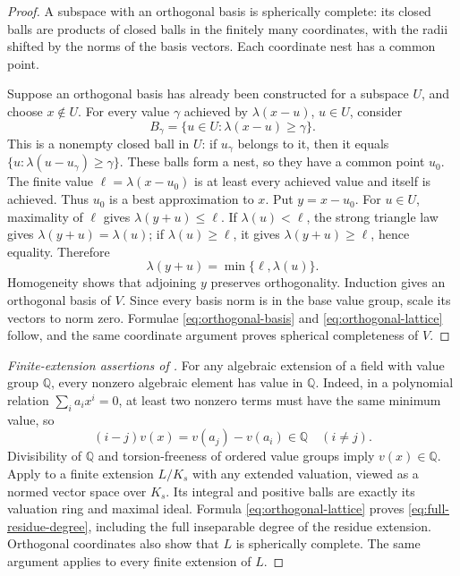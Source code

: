\begin{proof}
A subspace with an orthogonal basis is spherically complete: its closed
balls are products of closed balls in the finitely many coordinates,
with the radii shifted by the norms of the basis vectors.  Each
coordinate nest has a common point.

Suppose an orthogonal basis has already been constructed for a subspace
$U$, and choose $x\notin U$.  For every value $\gamma$ achieved by
$\lambda(x-u)$, $u\in U$, consider
\[
                  B_\gamma=\{u\in U:\lambda(x-u)\geq\gamma\}.
\]
This is a nonempty closed ball in $U$: if $u_\gamma$ belongs to it,
then it equals $\{u:\lambda(u-u_\gamma)\geq\gamma\}$.
These balls form a nest, so they have a common point $u_0$.
The finite value $\ell=\lambda(x-u_0)$ is at least every achieved value
and itself is achieved.  Thus $u_0$ is a best approximation to $x$.
Put $y=x-u_0$.  For $u\in U$, maximality of $\ell$ gives
$\lambda(y+u)\leq\ell$.  If $\lambda(u)<\ell$, the strong triangle
law gives $\lambda(y+u)=\lambda(u)$; if $\lambda(u)\geq\ell$, it gives
$\lambda(y+u)\geq\ell$, hence equality.  Therefore
\[
                       \lambda(y+u)=\min\{\ell,\lambda(u)\}.
\]
Homogeneity shows that adjoining $y$ preserves orthogonality.
Induction gives an orthogonal basis of $V$.  Since every basis norm is
in the base value group, scale its vectors to norm zero.
Formulae \eqref{eq:orthogonal-basis} and \eqref{eq:orthogonal-lattice}
follow, and the same coordinate argument proves spherical completeness
of $V$.
\end{proof}

\begin{proof}[Finite-extension assertions of ]
For any algebraic extension of a field with value group $\mathbb Q$,
every nonzero algebraic element has value in $\mathbb Q$.
Indeed, in a polynomial relation $\sum_i a_i x^i=0$, at least two
nonzero terms must have the same minimum value, so
\[
                       (i-j)v(x)=v(a_j)-v(a_i)\in\mathbb Q
                       \quad(i\ne j).
\]
Divisibility of $\mathbb Q$ and torsion-freeness of ordered value groups
imply $v(x)\in\mathbb Q$.
Apply  to a finite extension $L/K_s$ with any
extended valuation, viewed as a normed vector space over $K_s$.
Its integral and positive balls are exactly its valuation ring and
maximal ideal.  Formula \eqref{eq:orthogonal-lattice} proves
\eqref{eq:full-residue-degree}, including the full inseparable degree
of the residue extension.  Orthogonal coordinates also show that $L$
is spherically complete.  The same argument applies to every finite
extension of $L$.
\end{proof}

